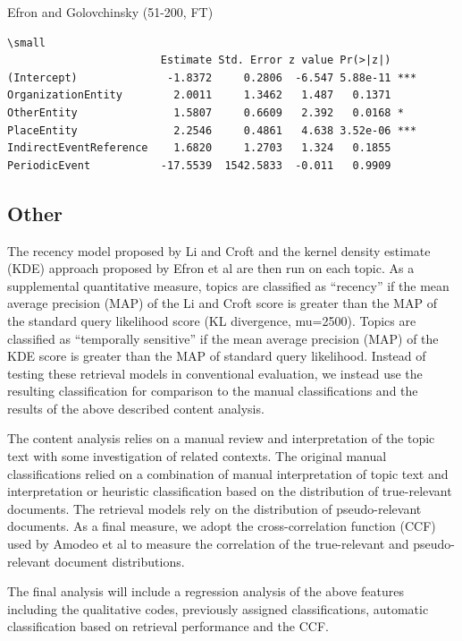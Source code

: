 \documentclass{sig-alternate}
\begin{document}
Efron and Golovchinsky (51-200, FT)

\begin{verbatim}
\small
                        Estimate Std. Error z value Pr(>|z|)    
(Intercept)              -1.8372     0.2806  -6.547 5.88e-11 ***
OrganizationEntity        2.0011     1.3462   1.487   0.1371    
OtherEntity               1.5807     0.6609   2.392   0.0168 *  
PlaceEntity               2.2546     0.4861   4.638 3.52e-06 ***
IndirectEventReference    1.6820     1.2703   1.324   0.1855    
PeriodicEvent           -17.5539  1542.5833  -0.011   0.9909  
\end{verbatim}



\subsection{Other}


The recency model proposed by Li and Croft \cite{Li2003} and the kernel density estimate (KDE) approach proposed by Efron et al \cite{Efron2014} are then run on each topic.  As a supplemental quantitative measure, topics are classified as ``recency'' if the mean average precision (MAP) of the Li and Croft score is greater than the MAP of the standard query likelihood score (KL divergence, mu=2500). Topics are classified as ``temporally sensitive'' if the mean average precision (MAP) of the KDE score is greater than the MAP of standard query likelihood. Instead of testing these retrieval models in conventional evaluation, we instead use the resulting classification for comparison to the manual classifications and the results of the above described content analysis.

The content analysis relies on a manual review and interpretation of the topic text with some investigation of related contexts. The original manual classifications relied on a combination of manual interpretation of topic text and interpretation or heuristic classification based on the distribution of true-relevant documents. The retrieval models rely on the distribution of pseudo-relevant documents.  As a final measure, we adopt the cross-correlation function (CCF) used by Amodeo et al \cite{Amodeo2011} to measure the correlation of the true-relevant and pseudo-relevant document distributions. 

The final analysis will include a regression analysis of the above features including the qualitative codes, previously assigned classifications, automatic classification based on retrieval performance and the CCF.
\end{document}
